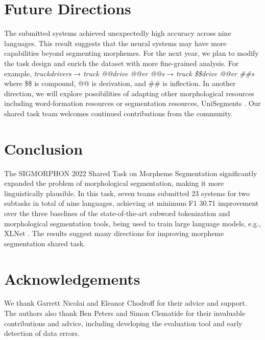 \documentclass[11pt]{article}
\begin{document}
\section{Future Directions}
The submitted systems achieved unexpectedly high accuracy across nine languages. This result suggests that the neural systems may have more capabilities beyond segmenting morphemes. For the next year, we plan to modify the task design and enrich the dataset with more fine-grained analysis. For example, \textit{truckdrivers} → \textit{truck @@drive @@er @@s} → \textit{truck \$\$drive @@er \#\#s} where \$\$ is compound, @@ is derivation, and \#\# is inflection.
In another direction, we will explore possibilities of adapting other morphological resources including word-formation resources \cite{zeller2013derivbase,talamo2016derivatario,derinet-2019,vodolazsky2020derivbase} or segmentation resources, UniSegments \cite{unisegments-lrec-2022,unisegments-data-2022}. Our shared task team welcomes continued contributions from the community. 






\section{Conclusion}
The SIGMORPHON 2022 Shared Task on Morpheme Segmentation significantly expanded the problem of morphological segmentation, making it more linguistically plausible. In this task, seven teams submitted 23 systems for two subtasks in total of nine languages, achieving at minimum F1 30.71 improvement over the three baselines of the state-of-the-art subword tokenization and morphological segmentation tools, being used to train large language models, e.g., XLNet \cite{yang2019xlnet}. The results suggest many directions for improving morpheme segmentation shared task.

\nocite{Ando2005,borschinger-johnson-2011-particle,andrew2007scalable,rasooli-tetrault-2015,goodman-etal-2016-noise,harper-2014-learning}

\section*{Acknowledgements}
We thank Garrett Nicolai and Eleanor Chodroff for their advice and support. The authors also thank Ben Peters and Simon Clematide for their invaluable contributions and advice, including developing the evaluation tool and early detection of data errors. 



\end{document}

